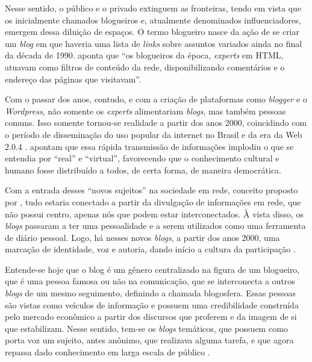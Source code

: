 \documentclass[portuguese]{textolivre}
\begin{document}
Nesse sentido, o público e o privado extinguem as fronteiras, tendo em vista que os inicialmente chamados blogueiros e, atualmente denominados influenciadores, emergem dessa diluição de espaços. O termo blogueiro nasce da ação de se criar um \textit{blog} em que haveria uma lista de \textit{links} sobre assuntos variados ainda no final da década de 1990. \textcite[p. 49]{karhawi_influenciadores_2017} aponta que “os blogueiros da época, \textit{experts} em HTML, atuavam como filtros de conteúdo da rede, disponibilizando comentários e o endereço das páginas que visitavam”. 

Com o passar dos anos, contudo, e com a criação de plataformas como \textit{blogger} e o \textit{Wordpress}, não somente os \textit{experts} alimentariam \textit{blogs}, mas também pessoas comuns. Isso somente tornou-se realidade a partir dos anos 2000, coincidindo com o período de disseminação do uso popular da internet no Brasil e da era da Web 2.0.4 \cite{karhawi_influenciadores_2017}.  \textcite{yunes_representacoes_2019} apontam que essa rápida transmissão de informações implodiu o que se entendia por “real” e “virtual”, favorecendo que o conhecimento cultural e humano fosse distribuído a todos, de certa forma, de maneira democrática. 

Com a entrada desses “novos sujeitos” na sociedade em rede, conceito proposto por \textcite{castells_informationalism_2004}, tudo estaria conectado a partir da divulgação de informações em rede, que não possui centro, apenas nós que podem estar interconectados. À vista disso, os \textit{blogs} passaram a ter uma pessoalidade e a serem utilizados como uma ferramenta de diário pessoal. Logo, há nesses novos \textit{blogs}, a partir dos anos 2000, uma marcação de identidade, voz e autoria, dando início a cultura da participação \cite{karhawi_influenciadores_2017}. 

Entende-se hoje que o blog é um gênero centralizado na figura de um blogueiro, que é uma pessoa famosa ou não na comunicação, que se interconecta a outros \textit{blogs} de um mesmo seguimento, definindo a chamada blogosfera. Essas pessoas são vistas como veículos de informação e possuem uma credibilidade construída pelo mercado econômico a partir dos discursos que proferem e da imagem de si que estabilizam. Nesse sentido, tem-se os \textit{blogs} temáticos, que possuem como porta voz um sujeito, antes anônimo, que realizava alguma tarefa, e que agora repassa dado conhecimento em larga escala de público \cite{karhawi_influenciadores_2017}.
\end{document}
